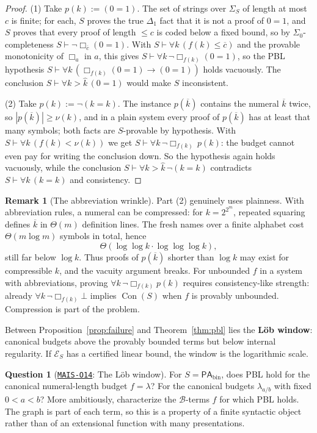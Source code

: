\documentclass[11pt]{amsart}
\newcommand{\Oid}[1]{\href{https://github.com/lionellevine/MAIS/blob/main/open-problems/MAIS-O#1.md}{\texttt{MAIS-O#1}}}
\theoremstyle{plain}
\theoremstyle{definition}
\newtheorem{question}[theorem]{Question}
\newtheorem{remark}[theorem]{Remark}
\newcommand{\PAbin}{\mathsf{PA}_{\mathrm{bin}}}
\newcommand{\Con}{\operatorname{Con}}
\newcommand{\num}[1]{\overline{#1}}
\newcommand{\Bud}{\mathcal{B}}
\begin{document}
\begin{proof}
(1) Take $p(k) := (0=1)$. The set of strings over $\Sigma_S$ of length at most $c$ is finite; for each, $S$ proves the true $\Delta_1$ fact that it is not a proof of $0=1$, and $S$ proves that every proof of length $\le c$ is coded below a fixed bound, so by $\Sigma_0$-completeness $S \vdash \neg\Box_{\num{c}}(0=1)$. With $S \vdash \forall k\,(f(k) \le \num{c})$ and the provable monotonicity of $\Box_a$ in $a$, this gives $S \vdash \forall k\,\neg\Box_{f(k)}(0=1)$, so the PBL hypothesis $S \vdash \forall k\,(\Box_{f(k)}(0=1) \to (0=1))$ holds vacuously. The conclusion $S \vdash \forall k > \hat{k}\,(0=1)$ would make $S$ inconsistent.

(2) Take $p(k) := \neg(k=k)$. The instance $p(\num{k})$ contains the numeral $\num{k}$ twice, so $|p(\num{k})| \ge \nu(k)$, and in a plain system every proof of $p(\num{k})$ has at least that many symbols; both facts are $S$-provable by hypothesis. With $S \vdash \forall k\,(f(k) < \nu(k))$ we get $S \vdash \forall k\,\neg\Box_{f(k)}\,p(k)$: the budget cannot even pay for writing the conclusion down. So the hypothesis again holds vacuously, while the conclusion $S \vdash \forall k>\hat{k}\,\neg(k=k)$ contradicts $S \vdash \forall k\,(k = k)$ and consistency.
\end{proof}

\begin{remark}[The abbreviation wrinkle]
\label{rem:abbrev}
Part (2) genuinely uses plainness. With abbreviation rules, a numeral can be compressed: for $k = 2^{2^m}$, repeated squaring defines $\num{k}$ in $\Theta(m)$ definition lines. The fresh names over a finite alphabet cost $\Theta(m\log m)$ symbols in total, hence
\[
\Theta(\log\log k\cdot\log\log\log k),
\]
still far below $\log k$. Thus proofs of $p(\num{k})$ shorter than $\log k$ may exist for compressible $k$, and the vacuity argument breaks. For unbounded $f$ in a system with abbreviations, proving $\forall k\,\neg\Box_{f(k)}p(k)$ requires consistency-like strength: already $\forall k\,\neg\Box_{f(k)}\bot$ implies $\Con(S)$ when $f$ is provably unbounded. Compression is part of the problem.
\end{remark}

Between Proposition~\ref{prop:failure} and Theorem~\ref{thm:pbl} lies the \textbf{L\"ob window}: canonical budgets above the provably bounded terms but below internal regularity. If $\mathcal{E}_S$ has a certified linear bound, the window is the logarithmic scale.

\begin{question}[\Oid{14}: The L\"ob window]
\label{q:window}
For $S=\PAbin$, does PBL hold for the canonical numeral-length budget $f=\lambda$? For the canonical budgets $\lambda_{a/b}$ with fixed $0<a<b$? More ambitiously, characterize the $\Bud$-terms $f$ for which PBL holds. The graph is part of each term, so this is a property of a finite syntactic object rather than of an extensional function with many presentations.
\end{question}
\end{document}
